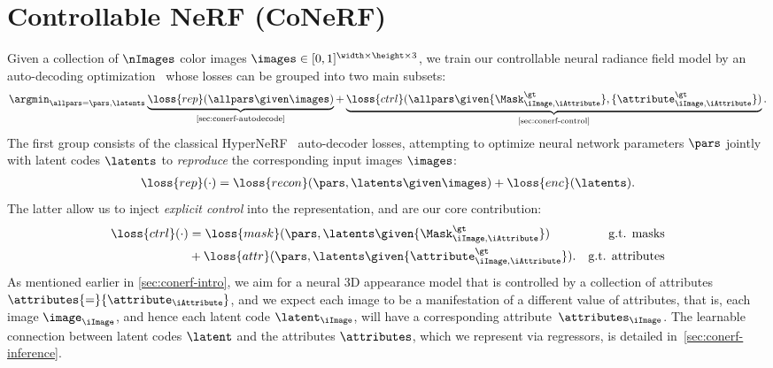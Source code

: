 
\section{Controllable NeRF (CoNeRF)}
  Given a collection of $\nImages$ color images $\images \in [0,1]^{\width \times \height \times 3}$, we train our controllable neural radiance field model by an auto-decoding optimization~\cite{park2019deepsdf} whose losses can be grouped into two main subsets:
  \begin{align}
    \argmin_{\allpars=\pars, \latents}
    \underbrace{\loss{rep}(\allpars \given \images)}_\text{\cref{sec:conerf-autodecode}}{+}
    \underbrace{\loss{ctrl}(\allpars \given
      \{\Mask^\gt_{\iImage, \iAttribute} \}, \{\attribute^\gt_{\iImage,\iAttribute}\} )}_\text{\cref{sec:conerf-control}}
    .
  \end{align}
  The first group consists of the classical HyperNeRF~\cite{park2021hypernerf} auto-decoder losses, attempting to optimize neural network parameters $\pars$ jointly with latent codes $\latents$ to \textit{reproduce} the corresponding input images $\images$:
  \begin{align}
    \loss{rep}(\cdot) =
    \loss{recon}(\pars, \latents \given \images) +
    \loss{enc}(\latents)
    .
    \label{eq:conerf-loss_render}
  \end{align}
  The latter allow us to inject \textit{explicit control} into the representation, and are our core contribution:
  \begin{align}
    \loss{ctrl}(\cdot)
     & = \loss{mask}(\pars, \latents \given \{\Mask^\gt_{\iImage, \iAttribute} \})     & \text{g.t. masks}      \\
     & + \loss{attr}(\pars, \latents \given \{\attribute^\gt_{\iImage,\iAttribute}\}). & \text{g.t. attributes}
    \label{eq:loss_control}
  \end{align}
  As mentioned earlier in \cref{sec:conerf-intro}, we aim for a neural 3D
  appearance model that is controlled by a collection of attributes
  $\attributes {=} \{\attribute_\iAttribute\}$, and we expect each image to be
  a manifestation of a different value of attributes, that is, each image
  $\image_\iImage$, and hence each latent code $\latent_\iImage$, will have a
  corresponding attribute~$\attributes_\iImage$.
  The learnable connection between latent codes $\latent$ and the attributes
  $\attributes$, which we represent via regressors, is detailed
  in~\cref{sec:conerf-inference}.

